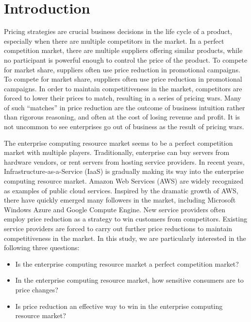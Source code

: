 \documentclass[10pt,journal,cspaper,compsoc]{IEEEtran}
\begin{document}
\section{Introduction}
\label{sec:intro}

Pricing strategies are crucial business decisions in the life cycle of a product, especially when there are multiple competitors in the market. In a perfect competition market, there are multiple suppliers offering similar products, while no participant is powerful enough to control the price of the product. To compete for market share, suppliers often use price reduction in promotional campaigns. %
To compete for market share, suppliers often use price reduction in promotional campaigns. In order to maintain competitiveness in the market, competitors are forced to lower their prices to match, resulting in a series of pricing wars.  Many of such ``matches''  in price reduction are the outcome of business intuition rather than rigorous reasoning, and often at the cost of losing revenue and profit. It is not uncommon to see enterprises go out of business as the result of pricing wars.

The enterprise computing resource market seems to be a perfect competition market with multiple players. Traditionally, enterprise can buy servers from hardware vendors, or rent servers from hosting service providers. In recent years, Infrastructure-as-a-Service (IaaS) is gradually making its way into the enterprise computing resource market. Amazon Web Services (AWS) are widely recognized as examples of public cloud services. %
Inspired by the dramatic growth of AWS, there have quickly emerged many followers in the market, including Microsoft Windows Azure and Google Compute Engine. New service providers often employ price reduction as a strategy to win customers from competitors. Existing service providers are forced to carry out further price reductions to maintain competitiveness in the market. In this study, we are particularly interested in the following three questions:

\begin{itemize}
	\item Is the enterprise computing resource market a perfect competition market? 
	\item In the enterprise computing resource market, how sensitive consumers are to price changes?
	\item Is price reduction an effective way to win in the enterprise computing resource market?
\end{itemize}
\end{document}
